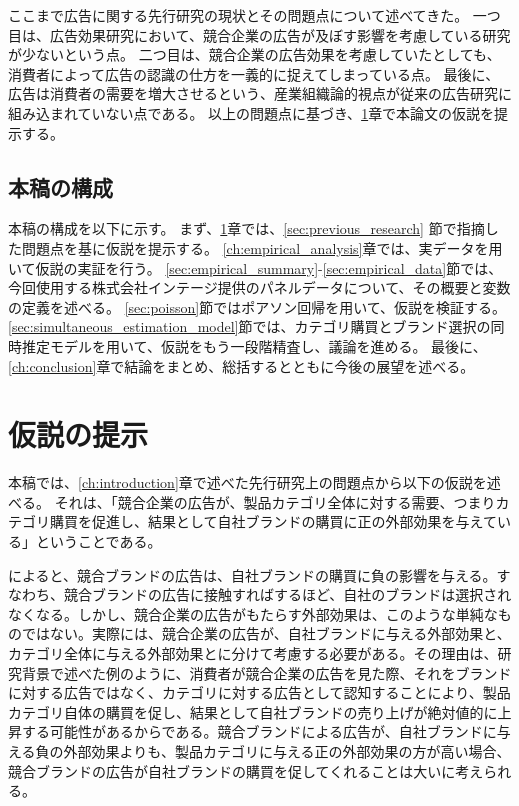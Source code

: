 \documentclass[11pt]{jsarticle}
\begin{document}
ここまで広告に関する先行研究の現状とその問題点について述べてきた。
一つ目は、広告効果研究において、競合企業の広告が及ぼす影響を考慮している研究が少ないという点。
二つ目は、競合企業の広告効果を考慮していたとしても、消費者によって広告の認識の仕方を一義的に捉えてしまっている点。
最後に、広告は消費者の需要を増大させるという、産業組織論的視点が従来の広告研究に組み込まれていない点である。
以上の問題点に基づき、\ref{ch:hypothesis}章で本論文の仮説を提示する。


\subsection{本稿の構成}
\label{sec:constitution}
本稿の構成を以下に示す。
まず、\ref{ch:hypothesis}章では、\ref{sec:previous_research} 節で指摘した問題点を基に仮説を提示する。
\ref{ch:empirical_analysis}章では、実データを用いて仮説の実証を行う。
\ref{sec:empirical_summary}-\ref{sec:empirical_data}節では、今回使用する株式会社インテージ提供のパネルデータについて、その概要と変数の定義を述べる。
\ref{sec:poisson}節ではポアソン回帰を用いて、仮説を検証する。
\ref{sec:simultaneous_estimation_model}節では、カテゴリ購買とブランド選択の同時推定モデルを用いて、仮説をもう一段階精査し、議論を進める。
最後に、\ref{ch:conclusion}章で結論をまとめ、総括するとともに今後の展望を述べる。

\section{仮説の提示}
\label{ch:hypothesis}
本稿では、\ref{ch:introduction}章で述べた先行研究上の問題点から以下の仮説を述べる。
それは、「競合企業の広告が、製品カテゴリ全体に対する需要、つまりカテゴリ購買を促進し、結果として自社ブランドの購買に正の外部効果を与えている」ということである。

\citet{shimizu1990}によると、競合ブランドの広告は、自社ブランドの購買に負の影響を与える。すなわち、競合ブランドの広告に接触すればするほど、自社のブランドは選択されなくなる。しかし、競合企業の広告がもたらす外部効果は、このような単純なものではない。実際には、競合企業の広告が、自社ブランドに与える外部効果と、カテゴリ全体に与える外部効果とに分けて考慮する必要がある。その理由は、研究背景で述べた例のように、消費者が競合企業の広告を見た際、それをブランドに対する広告ではなく、カテゴリに対する広告として認知することにより、製品カテゴリ自体の購買を促し、結果として自社ブランドの売り上げが絶対値的に上昇する可能性があるからである。競合ブランドによる広告が、自社ブランドに与える負の外部効果よりも、製品カテゴリに与える正の外部効果の方が高い場合、競合ブランドの広告が自社ブランドの購買を促してくれることは大いに考えられる。
\end{document}

